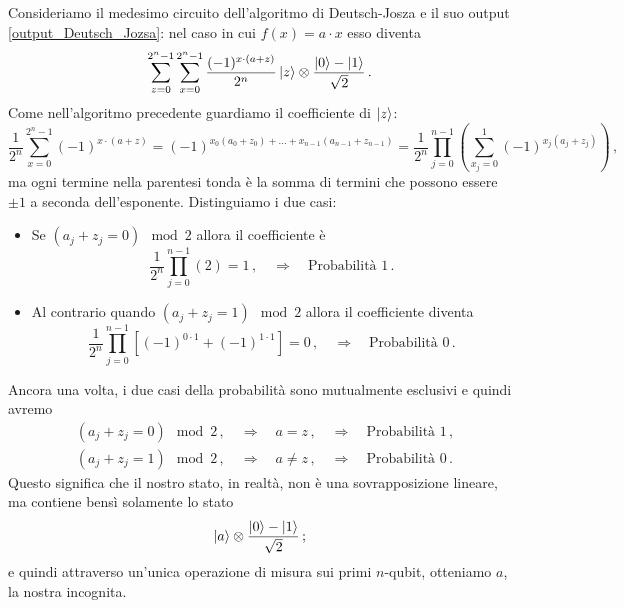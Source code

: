 \noindent Consideriamo il medesimo circuito dell'algoritmo di Deutsch-Josza e il suo output \eqref{output_Deutsch_Jozsa}: nel caso in cui $f(x) = a \cdot x$ esso diventa 
\begin{equation*}
    \sum_{z=0}^{2^n-1}\sum_{x=0}^{2^n-1}\frac{(-1)^{x\cdot (a+z)}}{2^n}\ket z \otimes \frac{\ket 0 - \ket 1}{\sqrt 2} \, .
\end{equation*}
Come nell'algoritmo precedente guardiamo il coefficiente di $\ket{z}$:
\begin{equation*}
        \frac{1}{2^n} \sum_{x=0}^{2^n-1}(-1)^{x\cdot (a+z)} = (-1)^{x_0(a_0+z_0) + \ldots + x_{n-1}(a_{n-1}+z_{n-1})} = \frac{1}{2^n} \prod_{j=0}^{n-1} \left( \sum_{x_j=0}^{1}(-1)^{x_j(a_j+z_j)} \right) \, ,
\end{equation*}
ma ogni termine nella parentesi tonda è la somma di termini che possono essere $\pm 1$ a seconda dell'esponente. Distinguiamo i due casi:
\begin{itemize}
    \item Se $(a_j+z_j=0)\mod2 $ allora il coefficiente è 
    \begin{equation*}
        \frac{1}{2^n} \prod_{j=0}^{n-1}(2) = 1 \, , \quad \Rightarrow \quad \text{Probabilità } 1 \, .
    \end{equation*}
    \item Al contrario quando $(a_j+z_j=1)\mod2$ allora il coefficiente diventa 
    \begin{equation*}
        \frac{1}{2^n} \prod_{j=0}^{n-1} \left[ (-1)^{0\cdot 1} + (-1)^{1 \cdot 1} \right] = 0 \, , \quad \Rightarrow \quad \text{Probabilità } 0 \, .
    \end{equation*}
\end{itemize}
Ancora una volta, i due casi della probabilità sono mutualmente esclusivi e quindi avremo
\begin{align*}
    &(a_j+z_j=0)\mod2 \, , \quad \Rightarrow \quad a = z \, , \quad \Rightarrow \quad \text{Probabilità } 1 \, , \\
    &(a_j+z_j=1)\mod2 \, , \quad \Rightarrow \quad a \neq z \, , \quad \Rightarrow \quad \text{Probabilità } 0 \, .
\end{align*}
Questo significa che il nostro stato, in realtà, non è una sovrapposizione lineare, ma contiene bensì solamente lo stato
\begin{equation*}
    \ket a \otimes \frac{\ket 0 - \ket 1}{\sqrt 2} \, ;
\end{equation*}
e quindi attraverso un'unica operazione di misura sui primi $n$-qubit, otteniamo $a$, la nostra incognita.